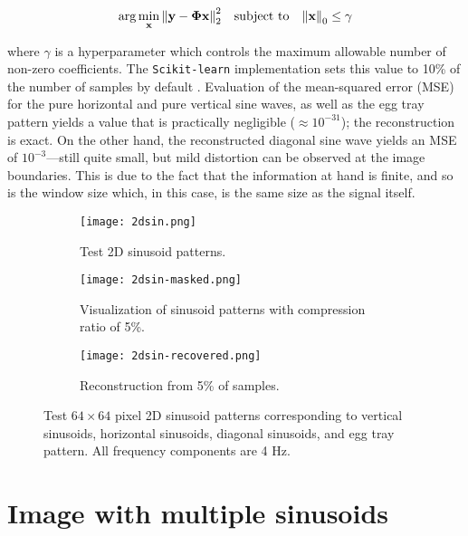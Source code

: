 \begin{equation}\label{eq:omp}
\arg\min_{\text{\bfseries x}} \norm{\text{\bfseries y} - \bm\Phi \text{\bfseries x}}_2^2 \quad \textrm{subject to} \quad \norm{\text{\bfseries x}}_0 \leq \gamma
\end{equation}

\noindent where $\gamma$ is a hyperparameter which controls the maximum allowable number of non-zero coefficients. The \texttt{Scikit-learn} implementation sets this value to 10\% of the number of samples by default \cite{scikit-learn}. Evaluation of the mean-squared error (MSE) for the pure horizontal and pure vertical sine waves, as well as the egg tray pattern yields a value that is practically negligible ($\approx 10^{-31}$); the reconstruction is exact. On the other hand, the reconstructed diagonal sine wave yields an MSE of $10^{-3}$---still quite small, but mild distortion can be observed at the image boundaries. This is due to the fact that the information at hand is finite, and so is the window size which, in this case, is the same size as the signal itself.

\begin{figure}[htb]
	\centering
	\begin{subfigure}{\textwidth}
		\centering
		\texttt{[image: 2dsin.png]}
		\caption{Test 2D sinusoid patterns.}
		\label{fig:2dsin}
	\end{subfigure}
	\begin{subfigure}{\textwidth}
		\centering
		\texttt{[image: 2dsin-masked.png]}
		\caption{Visualization of sinusoid patterns with compression ratio of 5\%.}
		\label{fig:2dsin-masked}
	\end{subfigure}
	\begin{subfigure}{\textwidth}
		\centering
		\texttt{[image: 2dsin-recovered.png]}
		\caption{Reconstruction from 5\% of samples.}
		\label{fig:2dsin-recovered}
	\end{subfigure}
	\caption{Test $64 \times 64$ pixel 2D sinusoid patterns corresponding to vertical sinusoids, horizontal sinusoids, diagonal sinusoids, and egg tray pattern. All frequency components are 4 Hz.}
	\label{fig:test-2dsin}
\end{figure}


\section{Image with multiple sinusoids}
\label{sec:2dmultisin}

